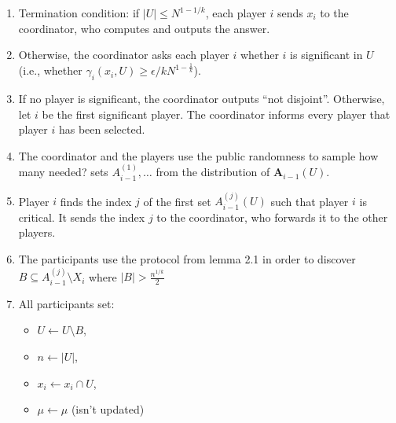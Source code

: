\documentclass{article}
\newcommand{\eps}{\epsilon}
\newcommand{\TODO}[1]{ {\color{red} #1 }}
\newcommand{\rv}[1]{\mathbf{#1}}
\theoremstyle{plain}
\begin{document}
\begin{enumerate}[(1)]
  \item Termination condition: if $|U| \leq N^{1 - 1/k}$, each player $i$ sends $x_i$ to the coordinator, who computes and outputs the answer. 
  \item Otherwise, the coordinator asks each player $i$ whether $i$ is significant in $U$ (i.e., whether $\gamma_i(x_i, U) \geq \eps / kN^{1-\frac{1}{k}}$).
  \item If no player is significant, the coordinator outputs ``not disjoint''. Otherwise, let $i$ be the
    first significant player. The coordinator informs every player that player $i$ has been selected.
  \item The coordinator and the players use the public randomness to sample \TODO{how many needed?}
    sets $A_{i-1}^{(1)},\ldots$ from the distribution of $\rv{A}_{i-1}(U)$.
  \item Player $i$ finds the index $j$ of the first set $A_{i-1}^{(j)}(U)$ such that player $i$ is critical.
    It sends the index $j$ to the coordinator, who forwards it to the other players.
  \item The participants use the protocol from lemma 2.1 in order to discover $B \subseteq A_{i-1}^{(j)} \setminus X_i $ where $ |B| > \frac{n^{1/k}}{2}$ 
  \item All participants set:
    \begin{itemize}
      \item $U \leftarrow U \setminus B$,
      \item $n \leftarrow |U|$,
      \item $x_i \leftarrow x_i \cap U$,
      \item $\mu \leftarrow \mu $ (isn't updated)
    \end{itemize}
\end{enumerate}

\end{document}
